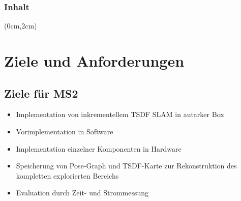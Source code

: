 \documentclass{beamer}
\begin{document}
{
\begin{frame}
\titlepage
\end{frame}}

\begin{frame}
\frametitle{Inhalt}
\tableofcontents
\begin{textblock*}{1cm}(0cm,2cm)
\end{textblock*}
\end{frame}



\section{Ziele und Anforderungen}
\begin{frame}{}
\begin{center}
\end{center}
\end{frame}

\subsection{Ziele für MS2}
\begin{frame}{\subsecname}
\begin{itemize}
\item Implementation von inkrementellem TSDF SLAM in \glqq{}autarker\grqq{} Box
\item Vorimplementation in Software
\item Implementation einzelner Komponenten in Hardware
\item Speicherung von Pose-Graph und TSDF-Karte zur Rekonstruktion des kompletten explorierten Bereichs
\item Evaluation durch Zeit- und Strommessung
\end{itemize}
\end{frame}
\end{document}
